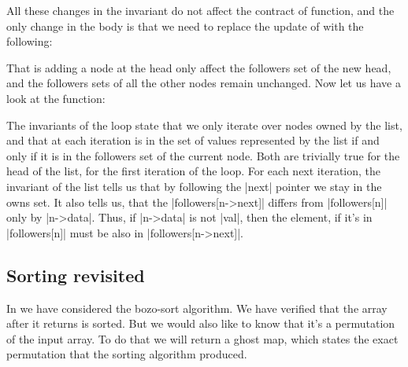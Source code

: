 
\noindent
All these changes in the invariant do not affect
the contract of  function, and the only change in the body
is that we need to replace the update of  with the following:


\noindent
That is adding a node at the head only affect the followers set of the new head,
and the followers sets of all the other nodes remain unchanged.
Now let us have a look at the  function:


\noindent
The invariants of the  loop state that we only iterate over
nodes owned by the list, and that at each iteration  is in the
set of values represented by the list if and only if it is in the followers
set of the current node.
Both are trivially true for the head of the list, for the first iteration
of the loop.
For each next iteration, the invariant of the list tells us that by following
the \vcc|next| pointer we stay in the owns set.
It also tells us, that the \vcc|followers[n->next]| differs
from \vcc|followers[n]| only by \vcc|n->data|.
Thus, if \vcc|n->data| is not \vcc|val|, then the element,
if it's in \vcc|followers[n]| must be also in \vcc|followers[n->next]|.

\subsection{Sorting revisited}
\label{sect:sorting-perm}

In  we have considered the bozo-sort algorithm. 
We have verified that the array after it returns is sorted.
But we would also like to know that it's a permutation of the input array.
To do that we will return a ghost map, which states the exact permutation
that the sorting algorithm produced.



